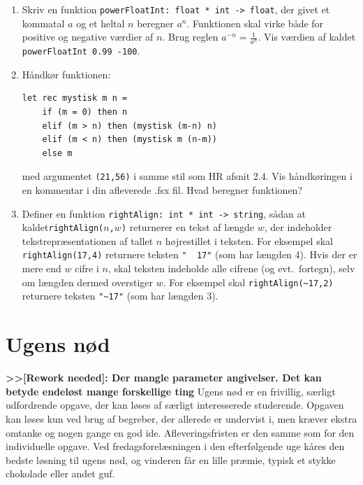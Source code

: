 \documentclass[a4paper,12pt]{article}
\begin{document}
\begin{enumerate}[{1I}1]
\item Skriv en funktion \verb|powerFloatInt: float * int -> float|,
  der givet et kommatal $a$ og et heltal $n$ beregner $a^n$. Funktionen
  skal virke både for positive og negative værdier af $n$. Brug reglen
  $a^{-n} = \frac{1}{a^n}$. Vis værdien af kaldet %
  \verb|powerFloatInt 0.99 -100|.

\item Håndkør funktionen:

\begin{verbatim}
let rec mystisk m n =
    if (m = 0) then n
    elif (m > n) then (mystisk (m-n) n)
    elif (m < n) then (mystisk m (n-m))
    else m
\end{verbatim}

med argumentet \verb|(21,56)| i samme stil som HR afsnit 2.4.
Vis håndkøringen i en kommentar i din afleverede .fsx fil. Hvad beregner funktionen?

\item Definer en funktion \verb|rightAlign: int * int -> string|,
  sådan at kaldet\newline \texttt{rightAlign($n$,$w$)} returnerer en
  tekst af længde $w$, der indeholder tekstrepræsentationen af tallet
  $n$ højrestillet i teksten.  For eksempel skal
  \texttt{rightAlign(17,4)} returnere teksten \texttt{"{}~~17"} (som
  har længden 4).  Hvis der er mere end $w$ cifre i $n$, skal teksten
  indeholde alle cifrene (og evt.\ fortegn), selv om længden dermed
  overstiger $w$.  For eksempel skal \verb|rightAlign(~17,2)|
  returnere teksten \verb|"~17"| (som har længden 3).

\end{enumerate}

\section{Ugens nød}
\label{sec:ugens-nod}

\textbf{>>[Rework needed]: Der mangle parameter angivelser. Det kan betyde endeløst mange forskellige ting}
Ugens nød er en frivillig, særligt udfordrende opgave, der kan løses
af særligt interesserede studerende.  Opgaven kan løses kun ved brug
af begreber, der allerede er undervist i, men kræver ekstra omtanke og
nogen gange en god ide.  Afleveringsfristen er den samme som for den
individuelle opgave.  Ved fredagsforelæsningen i den efterfølgende uge
kåres den bedste løsning til ugens nød, og vinderen får en lille
præmie, typisk et stykke chokolade eller andet guf.
\end{document}
